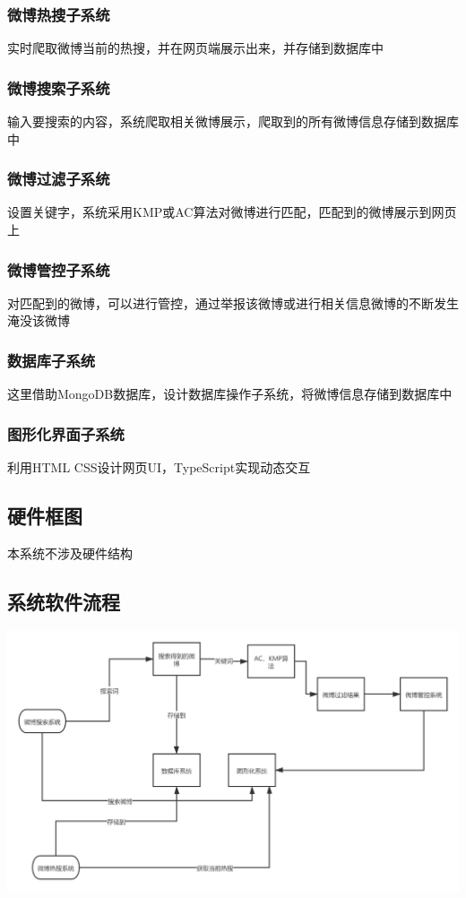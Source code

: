 \documentclass{ctexart}
\begin{document}
\subsubsection{微博热搜子系统}
实时爬取微博当前的热搜，并在网页端展示出来，并存储到数据库中
\subsubsection{微博搜索子系统}
输入要搜索的内容，系统爬取相关微博展示，爬取到的所有微博信息存储到数据库中
\subsubsection{微博过滤子系统}
设置关键字，系统采用KMP或AC算法对微博进行匹配，匹配到的微博展示到网页上
\subsubsection{微博管控子系统}
对匹配到的微博，可以进行管控，通过举报该微博或进行相关信息微博的不断发生淹没该微博
\subsubsection{数据库子系统}
这里借助MongoDB数据库，设计数据库操作子系统，将微博信息存储到数据库中
\subsubsection{图形化界面子系统}
利用HTML CSS设计网页UI，TypeScript实现动态交互
\subsection{硬件框图}
本系统不涉及硬件结构
\subsection{系统软件流程}
\includegraphics[width=\textwidth]{chart.png}
\end{document}
